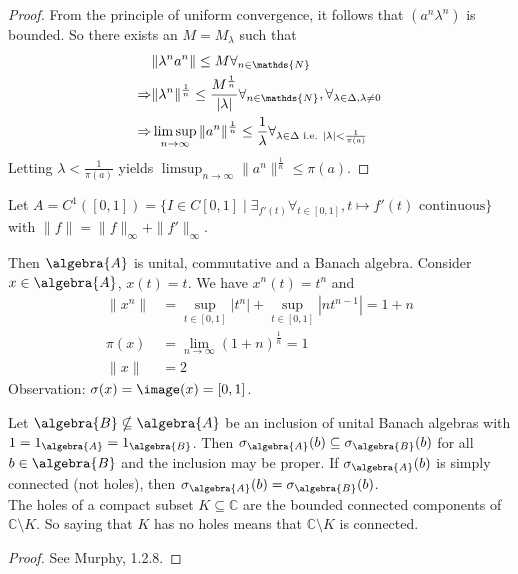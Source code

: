 \documentclass[a4paper]{article}
\begin{document}
\begin{proof}
	From the principle of uniform convergence, it follows that $(a^n \lambda^n)$ is bounded. So there exists an $M = M_\lambda$ such that
	\begin{align*}
		& \|\lambda^n a^n\| \leq M \forall_{n \in \mathds{N}}\\
		\then & \| \lambda^n \|^{\frac{1}{n}} \leq \frac{M^{\frac{1}{n}}}{|\lambda|} \forall_{n \in \mathds{N}}, \forall_{\lambda \in \Delta, \lambda \neq 0}\\
		\then & \limsup_{n \to \infty} \|a^n\|^{\frac{1}{n}} \leq \frac{1}{\lambda} \forall_{\lambda \in \Delta \text{ i.e. } |\lambda| < \frac{1}{\pi(a)}}
	\end{align*}
	Letting $\lambda < \frac{1}{\pi(a)}$ yields $\limsup_{n \to \infty} \|a^n\|^{\frac{1}{n}} \leq \pi(a)$.
\end{proof}

\begin{example}
	Let $A = C^1([0,1]) = \{ I \in C[0,1] \mid \exists_{f'(t)} \forall_{t \in [0,1]}, t \mapsto f'(t) \text{ continuous} \}$ with $\|f\| = \|f\|_\infty + \|f'\|_\infty$. 

	Then $\algebra{A}$ is unital, commutative and a Banach algebra. Consider $x \in \algebra{A}$, $x(t) = t$. We have $x^n(t) = t^n$ and
	\begin{align*}
		\|x^n\| &= \sup_{t \in [0,1]} |t^n| + \sup_{t \in [0,1]} |n t^{n-1}| = 1 + n\\
		\pi(x) &= \lim_{n \to \infty} (1+n)^\frac{1}{n} = 1\\
		\| x \| &= 2
	\end{align*}
	Observation: $\sigma(x) = \image(x) = [0,1]$.
\end{example}

\begin{theorem}
	Let $\algebra{B} \nsubseteq \algebra{A}$ be an inclusion of unital Banach algebras with $1 = 1_\algebra{A} = 1_\algebra{B}$. Then $\sigma_\algebra{A}(b) \subseteq \sigma_\algebra{B}(b)$ for all $b \in \algebra{B}$ and the inclusion may be proper. If $\sigma_\algebra{A}(b)$ is simply connected (not holes), then $\sigma_\algebra{A}(b) = \sigma_\algebra{B}(b)$.\\
	The holes of a compact subset $K \subseteq \mathds{C}$ are the bounded connected components of $\mathds{C} \setminus K$. So saying that $K$ has no holes means that $\mathds{C} \setminus K$ is connected.
\end{theorem}

\begin{proof}
	See Murphy, 1.2.8.
\end{proof}
\end{document}
